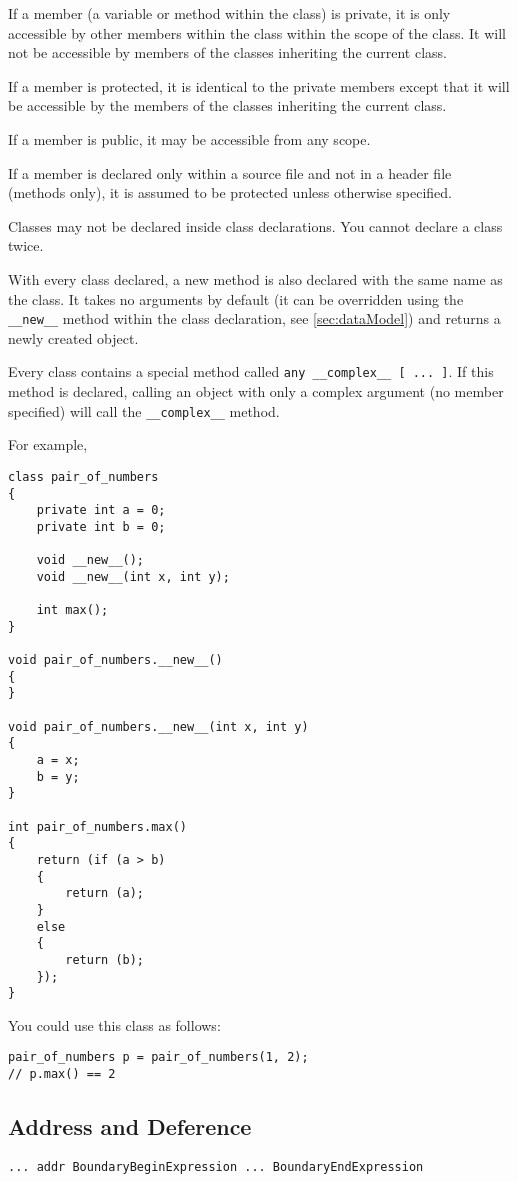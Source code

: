 \documentclass[10pt,a4paper]{article}
\begin{document}
If a member (a variable or method within the class) is private, it is only accessible by other members within the class within the scope of the class. It will not be accessible by members of the classes inheriting the current class.

If a member is protected, it is identical to the private members except that it will be accessible by the members of the classes inheriting the current class.

If a member is public, it may be accessible from any scope. 

If a member is declared only within a source file and not in a header file (methods only), it is assumed to be protected unless otherwise specified.

Classes may not be declared inside class declarations. You cannot declare a class twice.

With every class declared, a new method is also declared with the same name as the class. It takes no arguments by default (it can be overridden using the \verb|__new__| method within the class declaration, see \ref{sec:dataModel}) and returns a newly created object.

Every class contains a special method called \verb|any __complex__ [ ... ]|. If this method is declared, calling an object with only a complex argument (no member specified) will call the \verb|__complex__| method.

For example,
\begin{verbatim}
class pair_of_numbers
{
    private int a = 0;
    private int b = 0;
    
    void __new__();
    void __new__(int x, int y);
    
    int max();
}

void pair_of_numbers.__new__()
{
}

void pair_of_numbers.__new__(int x, int y)
{
    a = x;
    b = y;
}

int pair_of_numbers.max()
{
    return (if (a > b)
    {
        return (a);
    }
    else
    {
        return (b);
    });
}
\end{verbatim}

You could use this class as follows:
\begin{verbatim}
pair_of_numbers p = pair_of_numbers(1, 2);
// p.max() == 2
\end{verbatim}

\subsection{Address and Deference}
\begin{verbatim}
... addr BoundaryBeginExpression ... BoundaryEndExpression
\end{verbatim}
\end{document}
